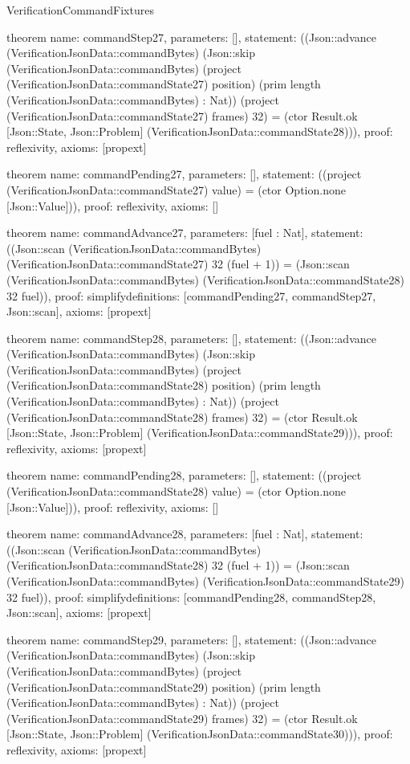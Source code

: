\begin{lexlean}{VerificationCommandFixtures}
\begin{semanticmodule}
theorem{
  name: commandStep27,
  parameters: [],
  statement: ((Json::advance (VerificationJsonData::commandBytes) (Json::skip (VerificationJsonData::commandBytes) (project (VerificationJsonData::commandState27) position) (prim length (VerificationJsonData::commandBytes) : Nat)) (project (VerificationJsonData::commandState27) frames) 32) = (ctor Result.ok [Json::State, Json::Problem] (VerificationJsonData::commandState28))),
  proof: reflexivity{},
  axioms: [propext]
}

theorem{
  name: commandPending27,
  parameters: [],
  statement: ((project (VerificationJsonData::commandState27) value) = (ctor Option.none [Json::Value])),
  proof: reflexivity{},
  axioms: []
}

theorem{
  name: commandAdvance27,
  parameters: [fuel : Nat],
  statement: ((Json::scan (VerificationJsonData::commandBytes) (VerificationJsonData::commandState27) 32 (fuel + 1)) = (Json::scan (VerificationJsonData::commandBytes) (VerificationJsonData::commandState28) 32 fuel)),
  proof: simplify{definitions: [commandPending27, commandStep27, Json::scan]},
  axioms: [propext]
}

theorem{
  name: commandStep28,
  parameters: [],
  statement: ((Json::advance (VerificationJsonData::commandBytes) (Json::skip (VerificationJsonData::commandBytes) (project (VerificationJsonData::commandState28) position) (prim length (VerificationJsonData::commandBytes) : Nat)) (project (VerificationJsonData::commandState28) frames) 32) = (ctor Result.ok [Json::State, Json::Problem] (VerificationJsonData::commandState29))),
  proof: reflexivity{},
  axioms: [propext]
}

theorem{
  name: commandPending28,
  parameters: [],
  statement: ((project (VerificationJsonData::commandState28) value) = (ctor Option.none [Json::Value])),
  proof: reflexivity{},
  axioms: []
}

theorem{
  name: commandAdvance28,
  parameters: [fuel : Nat],
  statement: ((Json::scan (VerificationJsonData::commandBytes) (VerificationJsonData::commandState28) 32 (fuel + 1)) = (Json::scan (VerificationJsonData::commandBytes) (VerificationJsonData::commandState29) 32 fuel)),
  proof: simplify{definitions: [commandPending28, commandStep28, Json::scan]},
  axioms: [propext]
}

theorem{
  name: commandStep29,
  parameters: [],
  statement: ((Json::advance (VerificationJsonData::commandBytes) (Json::skip (VerificationJsonData::commandBytes) (project (VerificationJsonData::commandState29) position) (prim length (VerificationJsonData::commandBytes) : Nat)) (project (VerificationJsonData::commandState29) frames) 32) = (ctor Result.ok [Json::State, Json::Problem] (VerificationJsonData::commandState30))),
  proof: reflexivity{},
  axioms: [propext]
}


\end{semanticmodule}
\end{lexlean}
